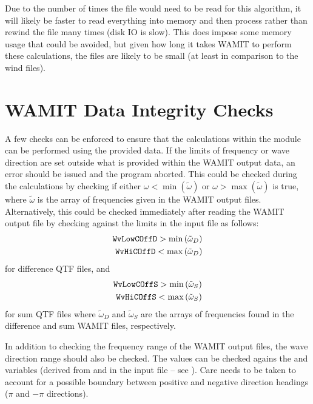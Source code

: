 Due to the number of times the file would need to be read for this algorithm, it will likely be faster to read everything into memory and then process rather than rewind the file many times (disk IO is slow).  This does impose some memory usage that could be avoided, but given how long it takes WAMIT to perform these calculations, the files are likely to be small (at least in comparison to the wind files).


\clearpage

\section{WAMIT Data Integrity Checks}
\label{sec:WamitOutput:Checks}
A few checks can be enforced to ensure that the calculations within the  module can be performed using the provided data.  If the limits of frequency or wave direction are set outside what is provided within the WAMIT output data, an error should be issued and the program aborted.  This could be checked during the calculations by checking if either $\omega < \min{(\tilde{\omega})}$ or $\omega > \max{(\tilde{\omega})}$ is true, where $\tilde{\omega}$ is the array of frequencies given in the WAMIT output files.  Alternatively, this could be checked immediately after reading the WAMIT output file by checking against the limits in the \HD input file as follows:
\begin{eqnarray}
   \texttt{WvLowCOffD} > \min{(\tilde{\omega}_D)}\\
   \texttt{WvHiCOffD}  < \max{(\tilde{\omega}_D)}
\label{eq:WAMIT:DataLimitTest:Diff}
\end{eqnarray}
for difference QTF files, and
\begin{eqnarray}
   \texttt{WvLowCOffS} > \min{(\tilde{\omega}_S)}\\
   \texttt{WvHiCOffS}  < \max{(\tilde{\omega}_S)}
\label{eq:WAMIT:DataLimitTest:Sum}
\end{eqnarray}
for sum QTF files where $\tilde{\omega}_D$ and $\tilde{\omega}_S$ are the arrays of frequencies found in the difference and sum WAMIT files, respectively.

In addition to checking the frequency range of the WAMIT output files, the wave direction range should also be checked.  The values can be checked agains the  and  variables (derived from  and  in the \HD input file -- see ).  Care needs to be taken to account for a possible boundary between positive and negative direction headings ($\pi$ and $-\pi$ directions).





\endinput
\section{Additional Data Requirements for the WAMIT2 Module}
\label{sec:WamitOutput:Req}

We will add some additional requirements for second order WAMIT files as they become evident (\emph{i.e.} frequency limits).



\begin{table}
\end{table}

